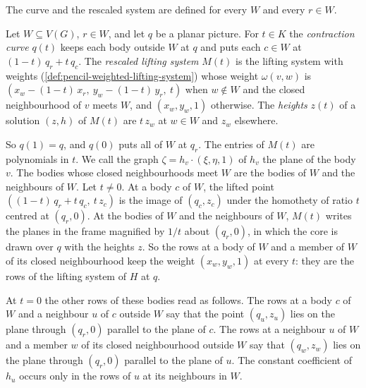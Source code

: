 The curve and the rescaled system are defined for every $W$ and every
$r \in W$.

\begin{definition}
  \label{def:pencil-contract-lifting-system}
  \leanok
  Let $W \subseteq V(G)$, $r \in W$, and let $q$ be a planar picture. For
  $t \in K$ the \emph{contraction curve} $q(t)$ keeps each body outside
  $W$ at $q$ and puts each $c \in W$ at $(1 - t)\,q_r + t\,q_c$. The
  \emph{rescaled lifting system} $M(t)$ is the lifting system with
  weights (\cref{def:pencil-weighted-lifting-system}) whose weight
  $\omega(v, w)$ is $(x_w - (1 - t)\,x_r,\ y_w - (1 - t)\,y_r,\ t)$ when
  $w \notin W$ and the closed neighbourhood of $v$ meets $W$, and
  $(x_w, y_w, 1)$ otherwise. The \emph{heights} $z(t)$ of a solution
  $(z, h)$ of $M(t)$ are $t\,z_w$ at $w \in W$ and $z_w$ elsewhere.
\end{definition}

So $q(1) = q$, and $q(0)$ puts all of $W$ at $q_r$. The entries of
$M(t)$ are polynomials in $t$. We call the graph
$\zeta = h_v \cdot (\xi, \eta, 1)$ of $h_v$ the plane of the body $v$.
The bodies whose closed neighbourhoods meet $W$ are the bodies of $W$ and
the neighbours of $W$. Let $t \neq 0$. At a body $c$ of $W$, the lifted
point $((1 - t)\,q_r + t\,q_c,\ t\,z_c)$ is the image of $(q_c, z_c)$
under the homothety of ratio $t$ centred at $(q_r, 0)$. At the bodies of
$W$ and the neighbours of $W$, $M(t)$ writes the planes in the frame
magnified by $1/t$ about $(q_r, 0)$, in which the core is drawn over $q$
with the heights $z$. So the rows at a body of $W$ and a member of $W$ of
its closed neighbourhood keep the weight $(x_w, y_w, 1)$ at every $t$:
they are the rows of the lifting system of $H$ at $q$.

At $t = 0$ the other rows of these bodies read as follows. The rows at a
body $c$ of $W$ and a neighbour $u$ of $c$ outside $W$ say that the point
$(q_u, z_u)$ lies on the plane through $(q_r, 0)$ parallel to the plane
of $c$. The rows at a neighbour $u$ of $W$ and a member $w$ of its closed
neighbourhood outside $W$ say that $(q_w, z_w)$ lies on the plane through
$(q_r, 0)$ parallel to the plane of $u$. The constant coefficient of
$h_u$ occurs only in the rows of $u$ at its neighbours in $W$.

